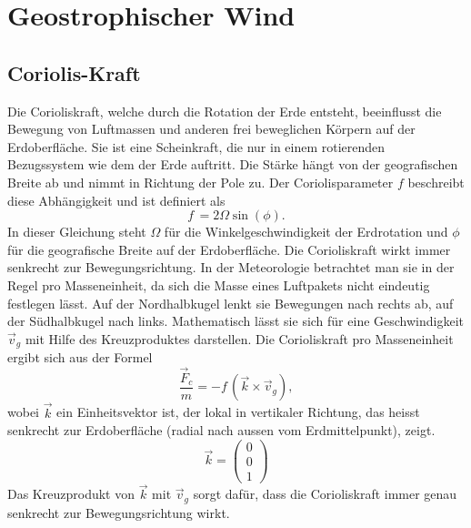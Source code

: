 %
%
%
%
\section{Geostrophischer Wind
\label{geostrophisch:section:geoWind}}


\subsection{Coriolis-Kraft
\label{geostrophisch:subsection:coriolis}}
Die Corioliskraft, welche durch die Rotation der Erde entsteht, beeinflusst die Bewegung von Luftmassen und anderen frei beweglichen Körpern auf der Erdoberfläche. Sie ist eine Scheinkraft, die nur in einem rotierenden Bezugssystem wie dem der Erde auftritt. Die Stärke hängt von der geografischen Breite ab und nimmt in Richtung der Pole zu.
Der Coriolisparameter $f$ beschreibt diese Abhängigkeit und ist definiert als 
\begin{equation}
f\, 
= 
2\Omega\sin(\phi)
\label{geostrophisch:equation1}.
\end{equation}
In dieser Gleichung steht $\Omega$ für die Winkelgeschwindigkeit der Erdrotation und $\phi$ für die geografische Breite auf der Erdoberfläche.
Die Corioliskraft wirkt immer senkrecht zur Bewegungsrichtung. In der Meteorologie betrachtet man sie in der Regel pro Masseneinheit, da sich die Masse eines Luftpakets nicht eindeutig festlegen lässt. Auf der Nordhalbkugel lenkt sie Bewegungen nach rechts ab, auf der Südhalbkugel nach links. Mathematisch lässt sie sich für eine Geschwindigkeit $\vec{v}_g $ mit Hilfe des Kreuzproduktes darstellen. 
Die Corioliskraft pro Masseneinheit ergibt sich aus der Formel
\begin{equation}
\frac{\vec{F}_c} {m}
= 
-f\, (\vec{k} \times \vec{v}_g) 
\label{geostrophisch:equation2},
\end{equation}
wobei $\vec{k}$ ein Einheitsvektor ist, der lokal in vertikaler Richtung, das heisst senkrecht zur Erdoberfläche (radial nach aussen vom Erdmittelpunkt), zeigt.
\begin{equation}
\vec{k} =
\left(
\begin{array}{c}
0 \\
0 \\
1
\end{array}
\right)
\label{geostrophisch:equation3}
\end{equation}
Das Kreuzprodukt von $\vec{k}$ mit  $\vec{v}_g $ sorgt dafür, dass die Corioliskraft immer genau senkrecht zur Bewegungsrichtung wirkt.

